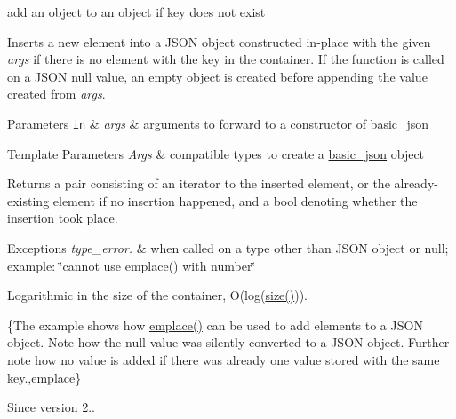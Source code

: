 add an object to an object if key does not exist 

Inserts a new element into a J\+S\+ON object constructed in-\/place with the given {\itshape args} if there is no element with the key in the container. If the function is called on a J\+S\+ON null value, an empty object is created before appending the value created from {\itshape args}.


\begin{DoxyParams}[1]{Parameters}
\mbox{\tt in}  & {\em args} & arguments to forward to a constructor of \mbox{\hyperlink{classnlohmann_1_1basic__json}{basic\+\_\+json}} \\
\hline
\end{DoxyParams}

\begin{DoxyTemplParams}{Template Parameters}
{\em Args} & compatible types to create a \mbox{\hyperlink{classnlohmann_1_1basic__json}{basic\+\_\+json}} object\\
\hline
\end{DoxyTemplParams}
\begin{DoxyReturn}{Returns}
a pair consisting of an iterator to the inserted element, or the already-\/existing element if no insertion happened, and a bool denoting whether the insertion took place.
\end{DoxyReturn}

\begin{DoxyExceptions}{Exceptions}
{\em type\+\_\+error.} & when called on a type other than J\+S\+ON object or null; example\+: {\ttfamily \char`\"{}cannot use emplace() with number\char`\"{}}\\
\hline
\end{DoxyExceptions}
Logarithmic in the size of the container, O(log({\ttfamily \mbox{\hyperlink{classnlohmann_1_1basic__json_a25e27ad0c6d53c01871c5485e1f75b96}{size()}}})).

\{The example shows how {\ttfamily \mbox{\hyperlink{classnlohmann_1_1basic__json_a5338e282d1d02bed389d852dd670d98d}{emplace()}}} can be used to add elements to a J\+S\+ON object. Note how the {\ttfamily null} value was silently converted to a J\+S\+ON object. Further note how no value is added if there was already one value stored with the same key.,emplace\}

\begin{DoxySince}{Since}
version 2.. 
\end{DoxySince}
\mbox{\label{classnlohmann_1_1basic__json_aacf5eed15a8b66fb1e88910707a5e229}} 
